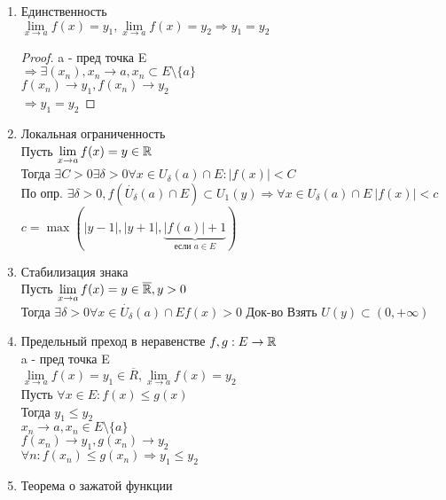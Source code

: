 \begin{enumerate}
	\item Единственность \\
	$ \lim\limits_{x \rightarrow a} f(x) = y_1, \lim\limits_{x \rightarrow a} f(x) = y_2 \Rightarrow y_1 = y_2 $ \\
	\begin{proof}
		a - пред точка E \\
		$ \Rightarrow  \exists (x_n), x_n \rightarrow a, x_n \subset E \setminus \{a\} $ \\
		$ f(x_n) \rightarrow y_1, f(x_n) \rightarrow y_2 $\\
		$ \Rightarrow y_1 = y_2 $
	\end{proof}
	\item Локальная ограниченность \\
	Пусть $  \lim\limits_{x \rightarrow a} f(x) = y \in \mathbb{R} $ \\
	Тогда $ \exists C > 0 \exists \delta > 0 \forall x \in U_{\delta} (a) \cap E : |f(x)| < C $ \\
	По опр. $ \exists \delta > 0, f(\dot{U_{\delta}}(a) \cap E) \subset U_1(y) \Rightarrow \forall x \in U_{\delta} (a) \cap E \ |f(x) | < c $ \\
	$ c = \max(|y-1|, |y+1|, \underbrace{|f(a)| + 1}_{\text{если } a \in E} )$ 
	\item Стабилизация знака \\
	Пусть  $ \lim\limits_{x \rightarrow a} f(x)  = y \in \overline{\mathbb{R}}, y >0$ \\
	Тогда $ \exists \delta > 0 \forall x \in \dot{U_\delta} (a) \cap E f(x) > 0 $
	Док-во Взять $ U(y) \subset (0, +\infty) $
	\item Предельный преход в неравенстве
	$ f, g : E \rightarrow \mathbb{R}$\\
	a - пред точка E \\
	$   \lim\limits_{x \rightarrow a} f(x) = y_1 \in \overline{R},  \lim\limits_{x \rightarrow a} f(x) = y_2 $ \\
	Пусть $ \forall x \in E : f(x) \leq g(x) $\\
	Тогда $ y_1 \leq y_2 $\\
	$ x_n \rightarrow a, x_n \in E \setminus \{a\} $ \\
	$ f(x_n) \rightarrow y_1, g(x_n) \rightarrow y_2 $ \\
	$ \forall n : f(x_n) \leq g(x_n)  \Rightarrow y_1 \leq y_2 $
	\item Теорема о зажатой функции \\

\end{enumerate}
